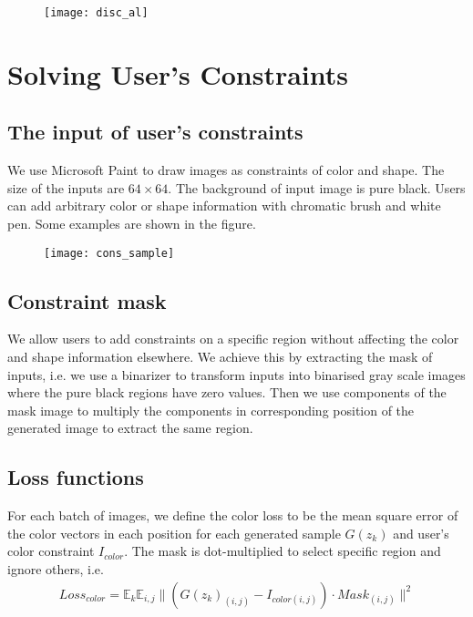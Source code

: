 \begin{figure}
	\centering
	\texttt{[image: disc\_al]}
	\label{fig:15}
\end{figure}


\section{Solving User's Constraints}
\subsection{The input of user's constraints}

We use Microsoft Paint to draw images as constraints of color and shape. The size of the inputs are $64\times64$. The background of input image is pure black. Users can add arbitrary color or shape information with chromatic brush and white pen. Some examples are shown in the figure.

\begin{figure}
	\centering
	\texttt{[image: cons\_sample]}
	\label{fig:16}
\end{figure}

\subsection{Constraint mask}

We allow users to add constraints on a specific region without affecting the color and shape information elsewhere. We achieve this by extracting the mask of inputs, i.e. we use a binarizer to transform inputs into binarised gray scale images where the pure black regions have zero values. Then we use components of the mask image to multiply the components in corresponding position of the generated image to extract the same region. 

\subsection{Loss functions}

For each batch of images, we define the color loss to be the mean square error of the color vectors in each position for each generated sample $G(z_k)$ and user's color constraint $I_{color}$. The mask is dot-multiplied to select specific region and ignore others, i.e.
\begin{equation}
\begin{aligned}
Loss_{color}=\mathbb{E}_{k}\mathbb{E}_{i,j}\|(G(z_k)_{(i,j)}-I_{color(i,j)})\cdot Mask_{(i,j)}\|^2
\end{aligned}
\end{equation}


